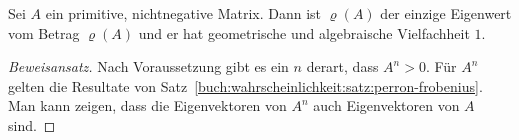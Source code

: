 \begin{satz}
\label{buch:wahrscheinlichkeit:satz:perron-frobenius2}
Sei $A$ ein primitive, nichtnegative Matrix.
Dann ist $\varrho(A)$ der einzige Eigenwert vom Betrag $\varrho(A)$
und er hat geometrische und algebraische Vielfachheit $1$.
\end{satz}

\begin{proof}[Beweisansatz]
Nach Voraussetzung gibt es ein $n$ derart, dass $A^n>0$.
Für $A^n$ gelten die Resultate von 
Satz~\ref{buch:wahrscheinlichkeit:satz:perron-frobenius}.
Man kann zeigen, dass die Eigenvektoren von $A^n$ auch 
Eigenvektoren von $A$ sind.
\end{proof}
